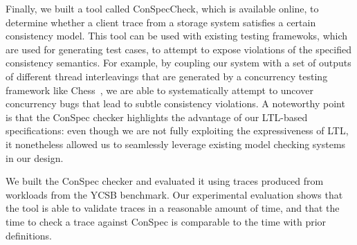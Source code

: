 \documentclass[journal,compsoc]{IEEEtran}
\begin{document}
Finally, we built a tool called ConSpecCheck, which is available online, to %
determine whether a client trace from a storage system satisfies a certain consistency model.
 This tool can be used with existing testing framewoks, which are used for generating test cases, to attempt to expose violations of the specified consistency semantics. For example, by coupling our system with a set of outputs of different thread interleavings that are generated by a concurrency testing framework like Chess~\cite{Musuvathi:2008:SCT:1390841.1390851}, we are able to systematically attempt to uncover concurrency bugs that lead to subtle consistency violations.
A noteworthy point is that the ConSpec checker highlights the advantage of our LTL-based specifications: even though we are not fully exploiting the expressiveness of LTL, it nonetheless allowed us to seamlessly leverage existing model checking systems in our design.


We built the ConSpec checker and evaluated it using traces produced from workloads from the YCSB benchmark. Our experimental evaluation shows that the tool is able to validate traces in a reasonable amount of time, and that the time to check a trace against ConSpec is comparable to the time with prior definitions.
\end{document}

